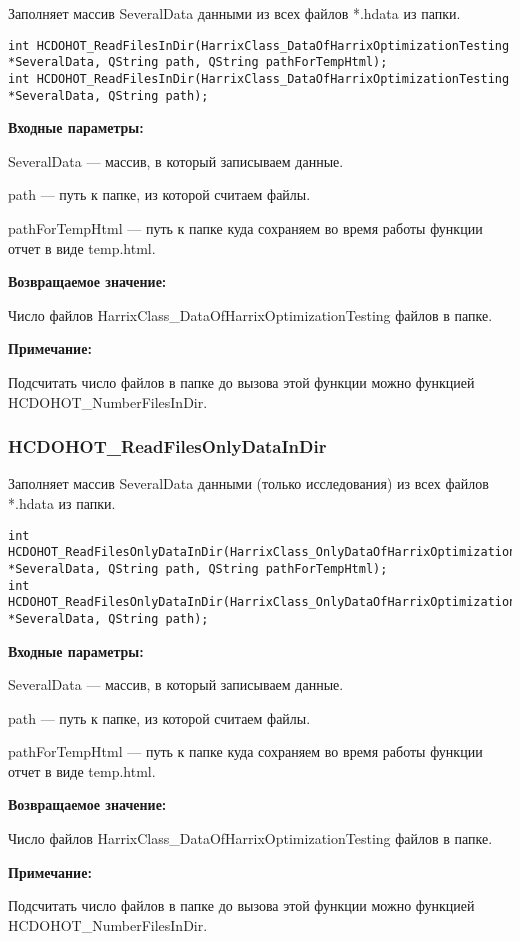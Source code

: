 \documentclass[a4paper,12pt]{article}
\begin{document}
Заполняет массив SeveralData данными из всех файлов *.hdata из папки.


\begin{lstlisting}[label=code_syntax_HCDOHOT_ReadFilesInDir,caption=Синтаксис]
int HCDOHOT_ReadFilesInDir(HarrixClass_DataOfHarrixOptimizationTesting *SeveralData, QString path, QString pathForTempHtml);
int HCDOHOT_ReadFilesInDir(HarrixClass_DataOfHarrixOptimizationTesting *SeveralData, QString path);
\end{lstlisting}

\textbf{Входные параметры:}
 
    SeveralData --- массив, в который записываем данные.
 
    path --- путь к папке, из которой считаем файлы.
 
    pathForTempHtml --- путь к папке куда сохраняем во время работы функции отчет в виде temp.html.

\textbf{Возвращаемое значение:}

Число файлов HarrixClass\_DataOfHarrixOptimizationTesting файлов в папке.

\textbf{Примечание:}

Подсчитать число файлов в папке до вызова этой функции можно функцией HCDOHOT\_NumberFilesInDir.



\subsubsection{HCDOHOT\_ReadFilesOnlyDataInDir}\label{HCDOHOT_ReadFilesOnlyDataInDir}

Заполняет массив SeveralData данными (только исследования) из всех файлов *.hdata из папки.


\begin{lstlisting}[label=code_syntax_HCDOHOT_ReadFilesOnlyDataInDir,caption=Синтаксис]
int HCDOHOT_ReadFilesOnlyDataInDir(HarrixClass_OnlyDataOfHarrixOptimizationTesting *SeveralData, QString path, QString pathForTempHtml);
int HCDOHOT_ReadFilesOnlyDataInDir(HarrixClass_OnlyDataOfHarrixOptimizationTesting *SeveralData, QString path);
\end{lstlisting}

\textbf{Входные параметры:}
 
    SeveralData --- массив, в который записываем данные.
 
    path --- путь к папке, из которой считаем файлы.
 
    pathForTempHtml --- путь к папке куда сохраняем во время работы функции отчет в виде temp.html.

\textbf{Возвращаемое значение:}

 
Число файлов HarrixClass\_DataOfHarrixOptimizationTesting файлов в папке.

\textbf{Примечание:}

Подсчитать число файлов в папке до вызова этой функции можно функцией HCDOHOT\_NumberFilesInDir.

\end{document}
